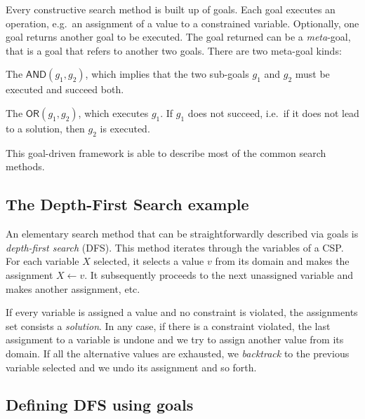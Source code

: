 \documentclass{ws-ijait}
\begin{document}
Every constructive search method is built up of goals. Each
goal executes an operation, e.g.\ an assignment of a value
to a constrained variable. Optionally, one goal returns
another goal to be executed. The goal returned can be a
\emph{meta}-goal, that is a goal that refers to another two
goals. There are two meta-goal kinds:
\begin{romanlist}
  \item The $\mathsf{AND}(g_1,g_2)$, which implies that the
        two sub-goals $g_1$ and $g_2$ must be executed and
        succeed both.
  \item The $\mathsf{OR}(g_1,g_2)$, which executes $g_1$. If
        $g_1$ does not succeed, i.e.\ if it does not lead to
        a solution, then $g_2$ is executed.
\end{romanlist}
This goal-driven framework is able to describe most of the
common search methods.

\subsection{The Depth-First Search example}

An elementary search method that can be straightforwardly
described via goals is \emph{depth-first search} (DFS). This
method iterates through the variables of a CSP\@. For each
variable $X$ selected, it selects a value $v$ from its
domain and makes the assignment $X \gets v$. It subsequently
proceeds to the next unassigned variable and makes another
assignment, etc.

If every variable is assigned a value and no constraint is
violated, the assignments set consists a \emph{solution}. In
any case, if there is a constraint violated, the last
assignment to a variable is undone and we try to assign
another value from its domain. If all the alternative values
are exhausted, we \emph{backtrack} to the previous variable
selected and we undo its assignment and so forth.

\subsection{Defining DFS using goals\label{DFS-goals}}
\end{document}
